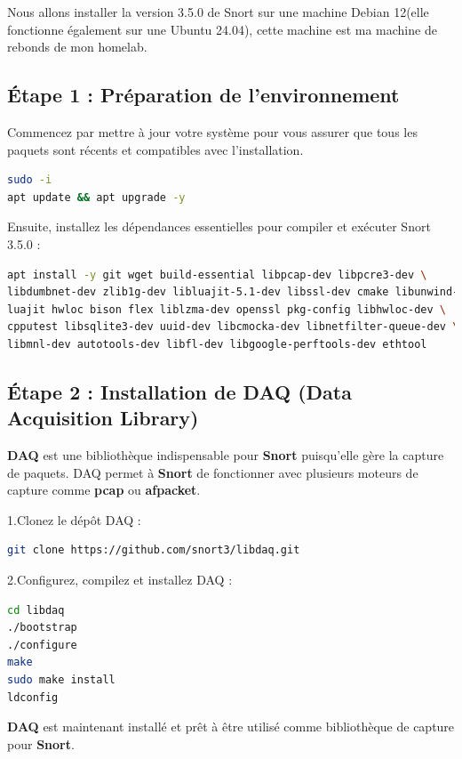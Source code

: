 \documentclass[12pt]{article}
\begin{document}
Nous allons installer la version 3.5.0 de Snort sur une machine Debian 12(elle fonctionne également sur une Ubuntu 24.04), cette machine est ma machine de rebonds de mon homelab.

\subsection*{Étape 1 : Préparation de l’environnement}

Commencez par mettre à jour votre système pour vous assurer que tous les paquets sont récents et compatibles avec l’installation.

\begin{lstlisting}[language=bash]
sudo -i
apt update && apt upgrade -y
\end{lstlisting}

Ensuite, installez les dépendances essentielles pour compiler et exécuter Snort 3.5.0 :
\begin{lstlisting}[language=bash]
apt install -y git wget build-essential libpcap-dev libpcre3-dev \
libdumbnet-dev zlib1g-dev libluajit-5.1-dev libssl-dev cmake libunwind-dev \
luajit hwloc bison flex liblzma-dev openssl pkg-config libhwloc-dev \
cpputest libsqlite3-dev uuid-dev libcmocka-dev libnetfilter-queue-dev \
libmnl-dev autotools-dev libfl-dev libgoogle-perftools-dev ethtool
\end{lstlisting}

\subsection*{Étape 2 : Installation de DAQ (Data Acquisition Library)}

\textbf{DAQ} est une bibliothèque indispensable pour \textbf{Snort} puisqu’elle gère la capture de paquets. DAQ permet à \textbf{Snort} de fonctionner avec plusieurs moteurs de capture comme \textbf{pcap} ou \textbf{afpacket}.

1.Clonez le dépôt DAQ :
\begin{lstlisting}[language=bash]
git clone https://github.com/snort3/libdaq.git\end{lstlisting}

2.Configurez, compilez et installez DAQ :
\begin{lstlisting}[language=bash]
cd libdaq
./bootstrap
./configure
make
sudo make install
ldconfig
\end{lstlisting}

\textbf{DAQ} est maintenant installé et prêt à être utilisé comme bibliothèque de capture pour \textbf{Snort}.
\end{document}
